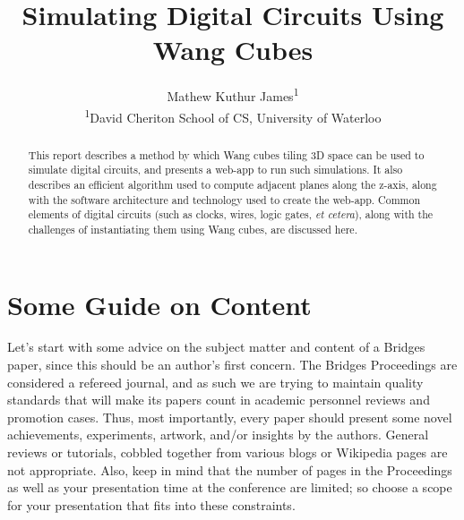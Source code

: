 \documentclass[letterpaper,11pt]{article}
\title{Simulating Digital Circuits Using Wang Cubes}
\author{Mathew Kuthur James\textsuperscript{1}
\vspace{10pt}\\
\textsuperscript{1}David Cheriton School of CS, University of Waterloo} %
\date{}					%
\begin{document}
\maketitle

\thispagestyle{empty}

\begin{abstract}

This report describes a method by which Wang cubes tiling 3D space can be used to simulate digital circuits, and presents a web-app to run such simulations. It also describes an efficient algorithm used to compute adjacent planes along the z-axis, along with the software architecture and technology used to create the web-app. Common elements of digital circuits (such as clocks, wires, logic gates, \emph{et cetera}), along with the challenges of instantiating them using Wang cubes, are discussed here.

\end{abstract}


\section*{Some Guide on Content}


Let's start with some advice on the subject matter and content of a
Bridges paper, since this should be an author's first concern. The
Bridges Proceedings are considered a refereed journal, and as such we
are trying to maintain quality standards that will make its papers count
in academic personnel reviews and promotion cases. Thus, most
importantly, every paper should present some novel achievements,
experiments, artwork, and/or insights by the authors. General reviews or
tutorials, cobbled together from various blogs or Wikipedia pages are
not appropriate. Also, keep in mind that the number of pages in the
Proceedings as well as your presentation time at the conference are
limited; so choose a scope for your presentation that fits into these
constraints.
\end{document}
